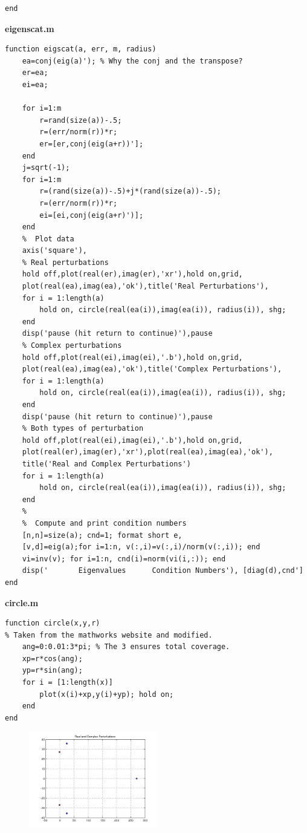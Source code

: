 \documentclass[a4paper]{article}
\begin{document}
\begin{enumerate}
\begin{center}
\begin{lstlisting}
end
\end{lstlisting}
\textbf{eigenscat.m}
\begin{lstlisting}
function eigscat(a, err, m, radius)
    ea=conj(eig(a)'); % Why the conj and the transpose? 
    er=ea; 
    ei=ea;
    
    for i=1:m
        r=rand(size(a))-.5; 
        r=(err/norm(r))*r; 
        er=[er,conj(eig(a+r))']; 
    end
    j=sqrt(-1); 
    for i=1:m
        r=(rand(size(a))-.5)+j*(rand(size(a))-.5); 
        r=(err/norm(r))*r;
        ei=[ei,conj(eig(a+r)')]; 
    end
    %  Plot data
    axis('square'),
    % Real perturbations
    hold off,plot(real(er),imag(er),'xr'),hold on,grid,
    plot(real(ea),imag(ea),'ok'),title('Real Perturbations'),
    for i = 1:length(a)
        hold on, circle(real(ea(i)),imag(ea(i)), radius(i)), shg;
    end
    disp('pause (hit return to continue)'),pause
    % Complex perturbations
    hold off,plot(real(ei),imag(ei),'.b'),hold on,grid,
    plot(real(ea),imag(ea),'ok'),title('Complex Perturbations'),
    for i = 1:length(a)
        hold on, circle(real(ea(i)),imag(ea(i)), radius(i)), shg;
    end
    disp('pause (hit return to continue)'),pause
    % Both types of perturbation
    hold off,plot(real(ei),imag(ei),'.b'),hold on,grid,
    plot(real(er),imag(er),'xr'),plot(real(ea),imag(ea),'ok'),
    title('Real and Complex Perturbations')
    for i = 1:length(a)
        hold on, circle(real(ea(i)),imag(ea(i)), radius(i)), shg;
    end
    %
    %  Compute and print condition numbers
    [n,n]=size(a); cnd=1; format short e,
    [v,d]=eig(a);for i=1:n, v(:,i)=v(:,i)/norm(v(:,i)); end
    vi=inv(v); for i=1:n, cnd(i)=norm(vi(i,:)); end
    disp('       Eigenvalues      Condition Numbers'), [diag(d),cnd']
end
\end{lstlisting}
\textbf{circle.m}
\begin{lstlisting}
function circle(x,y,r)
% Taken from the mathworks website and modified.
    ang=0:0.01:3*pi; % The 3 ensures total coverage.
    xp=r*cos(ang);
    yp=r*sin(ang);
    for i = [1:length(x)]
        plot(x(i)+xp,y(i)+yp); hold on;
    end
end
\end{lstlisting}
\begin{figure}
\centering
\includegraphics[width=0.5\textwidth]{1.jpg}

\end{figure}
\end{center}
\end{enumerate}
\end{document}
